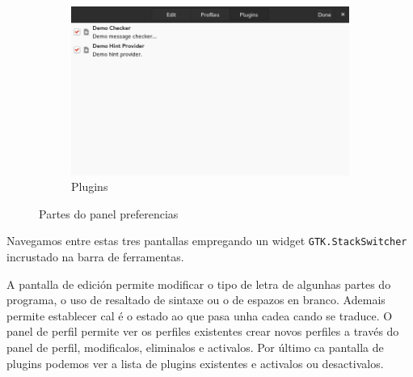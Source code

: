 \begin{figure}[h!]
\begin{subfigure}[b]{0.56\textwidth}
    \includegraphics[width=\textwidth]{img/panel_preferencias_plugins.png}
    \caption{Plugins}
  \end{subfigure}
    \caption{Partes do panel preferencias}
    \label{fig:ui:panel:preferences}
\end{figure}

Navegamos entre estas tres pantallas empregando un widget \lstinline{GTK.StackSwitcher} incrustado na barra de ferramentas.

A pantalla de edición permite modificar o tipo de letra de algunhas partes do programa, o uso de resaltado de sintaxe ou o de espazos en branco. Ademais permite establecer cal é o estado ao que pasa unha cadea cando se traduce. O panel de perfil permite ver os perfiles existentes crear novos perfiles a través do panel de perfil, modificalos, eliminalos e activalos. Por último ca pantalla de plugins podemos ver a lista de plugins existentes e activalos ou desactivalos.


